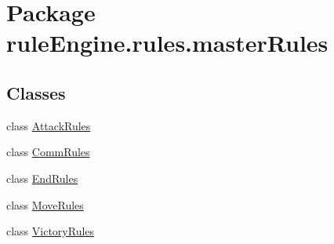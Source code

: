 \hypertarget{namespacerule_engine_1_1rules_1_1master_rules}{}\section{Package rule\+Engine.\+rules.\+master\+Rules}
\label{namespacerule_engine_1_1rules_1_1master_rules}
\subsection*{Classes}
\begin{DoxyCompactItemize}
\item 
class \mbox{\hyperlink{classrule_engine_1_1rules_1_1master_rules_1_1_attack_rules}{Attack\+Rules}}
\item 
class \mbox{\hyperlink{classrule_engine_1_1rules_1_1master_rules_1_1_comm_rules}{Comm\+Rules}}
\item 
class \mbox{\hyperlink{classrule_engine_1_1rules_1_1master_rules_1_1_end_rules}{End\+Rules}}
\item 
class \mbox{\hyperlink{classrule_engine_1_1rules_1_1master_rules_1_1_move_rules}{Move\+Rules}}
\item 
class \mbox{\hyperlink{classrule_engine_1_1rules_1_1master_rules_1_1_victory_rules}{Victory\+Rules}}
\end{DoxyCompactItemize}
